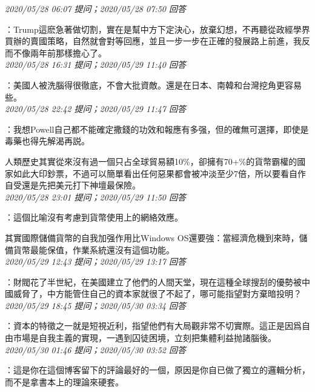 \documentclass[twocolumn]{ctexart}
\begin{document}
\textit{\hfill\noindent\small 2020/05/28 06:07 提问；2020/05/28 07:50 回答}

：Trump這麽急著做切割，實在是幫中方下定決心，放棄幻想，不再聽從政經學界買辦的賣國策略，自然就會對等回應，並且一步一步在正確的發展路上前進，我反而不像兩年前那樣擔心了。
\\

\textit{\hfill\noindent\small 2020/05/28 16:31 提问；2020/05/29 11:40 回答}

：美國人被洗腦得很徹底，不會大批資敵。還是在日本、南韓和台灣挖角更容易些。
\\

\textit{\hfill\noindent\small 2020/05/28 22:42 提问；2020/05/29 11:47 回答}

：我想Powell自己都不能確定撒錢的功效和報應有多强，但的確無可選擇，即使是毒藥也得先解渴再説。

人類歷史其實從來沒有過一個只占全球貿易額10\%，卻擁有70+\%的貨幣霸權的國家如此大印鈔票，不過可以簡單看出任何惡果都會被冲淡至少7倍，所以要看自作自受還是先把美元打下神壇最保險。
\\

\textit{\hfill\noindent\small 2020/05/28 23:01 提问；2020/05/29 11:50 回答}

：這個比喻沒有考慮到貨幣使用上的網絡效應。

其實國際儲備貨幣的自我加强作用比Windows OS還要強：當經濟危機到來時，儲備貨幣最能保值，作業系統還沒有這個功能。
\\

\textit{\hfill\noindent\small 2020/05/29 12:43 提问；2020/05/29 13:17 回答}

：財閥花了半世紀，在美國建立了他們的人間天堂，現在這種全球搜刮的優勢被中國威脅了，中方能管住自己的資本家就很了不起了，哪可能指望對方棄暗投明？
\\

\textit{\hfill\noindent\small 2020/05/29 18:45 提问；2020/05/30 03:34 回答}

：資本的特徵之一就是短視近利，指望他們有大局觀非常不切實際。這正是因爲自由市場是自我主義的實現，一遇到囚徒困境，立刻把集體利益抛諸腦後。
\\

\textit{\hfill\noindent\small 2020/05/30 01:46 提问；2020/05/30 03:52 回答}

：這是你在這個博客留下的評論最好的一個，原因是你自已做了獨立的邏輯分析，而不是拿書本上的理論來硬套。
\end{document}
